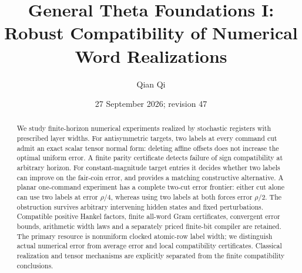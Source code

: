 \documentclass[11pt]{amsart}
\title[Robust compatible realization]{General Theta Foundations I: Robust Compatibility of Numerical Word Realizations}
\author{Qian Qi}
\date{27 September 2026; revision 47}
\numberwithin{equation}{section}
\theoremstyle{definition}\newtheorem{definition}[theorem]{Definition}
\begin{document}
\begin{abstract}
We study finite-horizon numerical experiments realized by stochastic
registers with prescribed layer widths. For antisymmetric targets,
two labels at every command cut admit an exact scalar tensor normal
form: deleting affine offsets does not increase the optimal uniform
error. A finite parity certificate detects failure of sign compatibility
at arbitrary horizon. For constant-magnitude target entries it decides
whether two labels can improve on the fair-coin error, and provides a
matching constructive alternative. A planar one-command experiment has
a complete two-cut error frontier: either cut alone can use two labels
at error $\rho/4$, whereas using two labels at both forces error
$\rho/2$. The obstruction survives arbitrary intervening hidden states
and fixed perturbations. Compatible positive Hankel factors, finite
all-word Gram certificates, convergent error bounds, arithmetic width
laws and a separately priced finite-bit compiler are retained.
The primary resource is nonuniform clocked atomic-row label width;
we distinguish actual numerical error from average error and local
compatibility certificates. Classical realization and tensor mechanisms
are explicitly separated from the finite compatibility conclusions.
\end{abstract}
\maketitle














\end{document}
